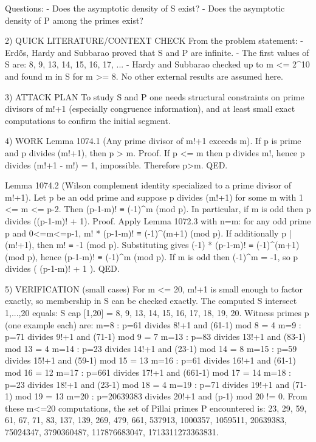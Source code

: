 Questions:
- Does the asymptotic density of S exist?
- Does the asymptotic density of P among the primes exist?

2) QUICK LITERATURE/CONTEXT CHECK
From the problem statement:
- Erdős, Hardy and Subbarao proved that S and P are infinite.
- The first values of S are: 8, 9, 13, 14, 15, 16, 17, ...
- Hardy and Subbarao checked up to m <= 2^10 and found m in S for m >= 8.
No other external results are assumed here.

3) ATTACK PLAN
To study S and P one needs structural constraints on prime divisors of m!+1 (especially congruence information), and at least small exact computations to confirm the initial segment.

4) WORK
Lemma 1074.1 (Any prime divisor of m!+1 exceeds m).
If p is prime and p divides (m!+1), then p > m.
Proof. If p <= m then p divides m!, hence p divides (m!+1 - m!) = 1, impossible. Therefore p>m. QED.

Lemma 1074.2 (Wilson complement identity specialized to a prime divisor of m!+1).
Let p be an odd prime and suppose p divides (m!+1) for some m with 1 <= m <= p-2.
Then (p-1-m)! ≡ (-1)^m (mod p). In particular, if m is odd then p divides ((p-1-m)! + 1).
Proof. Apply Lemma 1072.3 with n=m: for any odd prime p and 0<=m<=p-1,
  m! * (p-1-m)! ≡ (-1)^(m+1) (mod p).
If additionally p | (m!+1), then m! ≡ -1 (mod p). Substituting gives
  (-1) * (p-1-m)! ≡ (-1)^(m+1) (mod p),
hence (p-1-m)! ≡ (-1)^m (mod p). If m is odd then (-1)^m = -1, so p divides ( (p-1-m)! + 1 ). QED.

5) VERIFICATION (small cases)
For m <= 20, m!+1 is small enough to factor exactly, so membership in S can be checked exactly.
The computed S intersect {1,...,20} equals:
  S cap [1,20] = {8, 9, 13, 14, 15, 16, 17, 18, 19, 20}.
Witness primes p (one example each) are:
  m=8  : p=61 divides 8!+1 and (61-1) mod 8 = 4
  m=9  : p=71 divides 9!+1 and (71-1) mod 9 = 7
  m=13 : p=83 divides 13!+1 and (83-1) mod 13 = 4
  m=14 : p=23 divides 14!+1 and (23-1) mod 14 = 8
  m=15 : p=59 divides 15!+1 and (59-1) mod 15 = 13
  m=16 : p=61 divides 16!+1 and (61-1) mod 16 = 12
  m=17 : p=661 divides 17!+1 and (661-1) mod 17 = 14
  m=18 : p=23 divides 18!+1 and (23-1) mod 18 = 4
  m=19 : p=71 divides 19!+1 and (71-1) mod 19 = 13
  m=20 : p=20639383 divides 20!+1 and (p-1) mod 20 != 0.
From these m<=20 computations, the set of Pillai primes P encountered is:
  {23, 29, 59, 61, 67, 71, 83, 137, 139, 269, 479, 661, 537913, 1000357, 1059511, 20639383, 75024347, 3790360487, 117876683047, 1713311273363831}.

